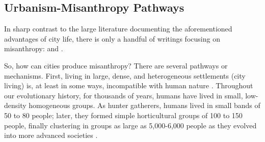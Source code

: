 \documentclass[11pt, letterpaper]{article}
\begin{document}
\begin{spacing}{1.4}



\subsection*{Urbanism-Misanthropy Pathways}

In sharp contrast to the large literature documenting the aforementioned advantages of city life, there is only a handful of writings focusing on misanthropy: 
\cite{thrift05,melgar13,keeling13,smith97,bloch87,wilson85,ray81,gibson17} and \citet{rosenberg57,rosenberg56}.


So, how can cities produce misanthropy? There are several pathways or mechanisms. 
First, living in large, dense, and heterogeneous settlements (city living) is, at least in some ways, incompatible with human nature \citep{haidt12B}. Throughout our evolutionary
history, for thousands of years, humans have lived in small, low-density
homogeneous groups. As hunter gatherers, humans lived in small bands of 50 to 80
people; later, they formed simple horticultural groups of 100 to 150 people,
finally clustering in groups as large as 5,000-6,000  people as they evolved
into more advanced societies \citep{maryanski92}.


\end{spacing}
\end{document}
